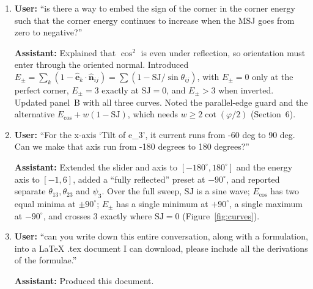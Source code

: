 \documentclass[11pt]{article}
\theoremstyle{definition}
\theoremstyle{remark}
\newcommand{\uv}[1]{\hat{\bm{#1}}}
\newcommand{\Es}{E_{\pm}}
\newcommand{\Eu}{E_{\cos}}
\newcommand{\SJ}{\mathrm{SJ}}
\begin{document}
\begin{enumerate}[label=\textbf{\arabic*.},leftmargin=*,itemsep=0.8em]
\item \textbf{User:} ``is there a way to embed the sign of the corner in the corner energy such that
the corner energy continues to increase when the MSJ goes from zero to negative?''

\textbf{Assistant:} Explained that $\cos^2$ is even under reflection, so orientation must enter
through the oriented normal. Introduced $\Es=\sum_k(1-\uv{e}_k\cdot\uv{n}_{ij})=\sum(1-\SJ/\sin\theta_{ij})$,
with $\Es=0$ only at the perfect corner, $\Es=3$ exactly at $\SJ=0$, and $\Es>3$ when inverted.
Updated panel~B with all three curves. Noted the parallel-edge guard and the alternative
$\Eu+w(1-\SJ)$, which needs $w\ge2\cot(\varphi/2)$ (Section~6).

\item \textbf{User:} ``For the x-axis `Tilt of e\_3', it current runs from -60 deg to 90 deg. Can we
make that axis run from -180 degrees to 180 degrees?''

\textbf{Assistant:} Extended the slider and axis to $[-180^\circ,180^\circ]$ and the energy axis to
$[-1,6]$, added a ``fully reflected'' preset at $-90^\circ$, and reported separate $\theta_{13},\theta_{23}$
and $\psi_3$. Over the full sweep, $\SJ$ is a sine wave; $\Eu$ has two equal minima at
$\pm90^\circ$; $\Es$ has a single minimum at $+90^\circ$, a single maximum at $-90^\circ$, and crosses
$3$ exactly where $\SJ=0$ (Figure~\ref{fig:curves}).

\item \textbf{User:} ``can you write down this entire conversation, along with a formulation, into a
LaTeX .tex document I can download, please include all the derivations of the formulae.''

\textbf{Assistant:} Produced this document.
\end{enumerate}
\end{document}
